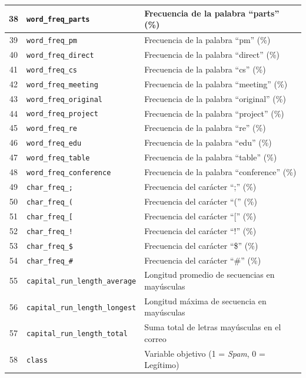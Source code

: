 \documentclass[a4paper,11pt ,openany]{book}
\begin{document}
\begin{longtable}{|c|l|l|}
38 & \texttt{word\_freq\_parts} & Frecuencia de la palabra ``parts'' (\%) \\ \hline
39 & \texttt{word\_freq\_pm} & Frecuencia de la palabra ``pm'' (\%) \\ \hline
40 & \texttt{word\_freq\_direct} & Frecuencia de la palabra ``direct'' (\%) \\ \hline
41 & \texttt{word\_freq\_cs} & Frecuencia de la palabra ``cs'' (\%) \\ \hline
42 & \texttt{word\_freq\_meeting} & Frecuencia de la palabra ``meeting'' (\%) \\ \hline
43 & \texttt{word\_freq\_original} & Frecuencia de la palabra ``original'' (\%) \\ \hline
44 & \texttt{word\_freq\_project} & Frecuencia de la palabra ``project'' (\%) \\ \hline
45 & \texttt{word\_freq\_re} & Frecuencia de la palabra ``re'' (\%) \\ \hline
46 & \texttt{word\_freq\_edu} & Frecuencia de la palabra ``edu'' (\%) \\ \hline
47 & \texttt{word\_freq\_table} & Frecuencia de la palabra ``table'' (\%) \\ \hline
48 & \texttt{word\_freq\_conference} & Frecuencia de la palabra ``conference'' (\%) \\ \hline
49 & \texttt{char\_freq\_;} & Frecuencia del carácter ``;'' (\%) \\ \hline
50 & \texttt{char\_freq\_(} & Frecuencia del carácter ``('' (\%) \\ \hline
51 & \texttt{char\_freq\_[} & Frecuencia del carácter ``['' (\%) \\ \hline
52 & \texttt{char\_freq\_!} & Frecuencia del carácter ``!'' (\%) \\ \hline
53 & \texttt{char\_freq\_\$} & Frecuencia del carácter ``\$'' (\%) \\ \hline
54 & \texttt{char\_freq\_\#} & Frecuencia del carácter ``\#'' (\%) \\ \hline
55 & \texttt{capital\_run\_length\_average} & Longitud promedio de secuencias en mayúsculas \\ \hline
56 & \texttt{capital\_run\_length\_longest} & Longitud máxima de secuencia en mayúsculas \\ \hline
57 & \texttt{capital\_run\_length\_total} & Suma total de letras mayúsculas en el correo \\ \hline
58 & \texttt{class} & Variable objetivo (1 = \textit{Spam}, 0 = Legítimo) \\ 
\end{longtable}
\end{document}
